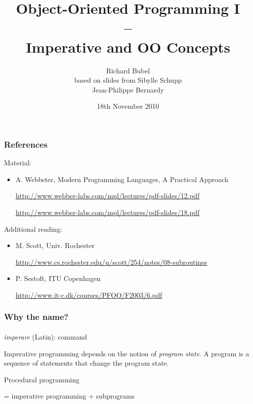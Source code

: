 \documentclass{beamer}
\title[OO - Imperative Concepts]
{Object-Oriented Programming I\\--\\Imperative and OO Concepts}
\subtitle{} %
\author[Richard Bubel] %
{Richard Bubel\\ based on slides from Sibylle Schupp \\
Jean-Philippe Bernardy}
\date{18th November 2010}%
\begin{document}
\begin{frame}
  \titlepage
\end{frame}


\begin{frame}[fragile]
\frametitle{References}
Material:
\begin{itemize}
\item 
A. Webbster, Modern Programming Languages, A Practical Approach

\url{
http://www.webber-labs.com/mpl/lectures/pdf-slides/12.pdf} 

\url{
http://www.webber-labs.com/mpl/lectures/pdf-slides/18.pdf}

\end{itemize}

Additional reading:
\begin{itemize}
\item M. Scott, Univ. Rochester

\url{
http://www.cs.rochester.edu/u/scott/254/notes/08-subroutines}

\item P. Sestoft, ITU Copenhagen

\url{http://www.it-c.dk/courses/PFOO/F2003/6.pdf}
\end{itemize}
\end{frame}

\begin{frame}[fragile]
\frametitle{Why the name?}
\framesubtitle{}
\textit{imperare} (Latin): command
\bigskip

Imperative programming depends on the notion of \textit{program state}.
A program is a sequence of statements that change the program state.

\bigskip
Procedural programming 

= imperative programming + subprograms

\end{frame}
\end{document}
